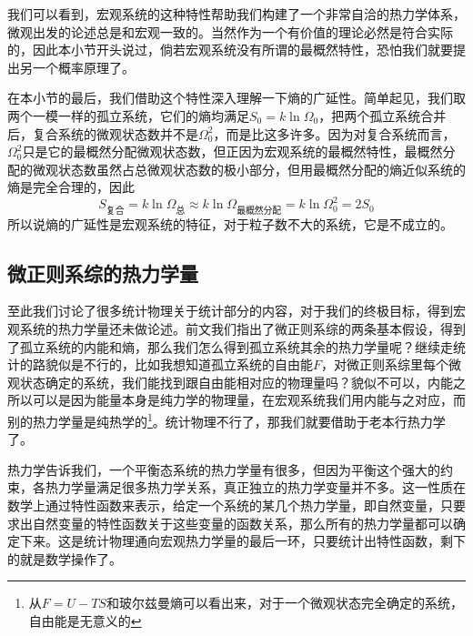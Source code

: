 \documentclass[../../main.tex]{subfiles}
\begin{document}
我们可以看到，宏观系统的这种特性帮助我们构建了一个非常自洽的热力学体系，微观出发的论述总是和宏观一致的。当然作为一个有价值的理论必然是符合实际的，因此本小节开头说过，倘若宏观系统没有所谓的最概然特性，恐怕我们就要提出另一个概率原理了。

在本小节的最后，我们借助这个特性深入理解一下熵的广延性。简单起见，我们取两个一模一样的孤立系统，它们的熵均满足\(S_0=k\ln\Omega_0\)，把两个孤立系统合并后，复合系统的微观状态数并不是\(\Omega_0^2\)，而是比这多许多。因为对复合系统而言，\(\Omega_0^2\)只是它的最概然分配微观状态数，但正因为宏观系统的最概然特性，最概然分配的微观状态数虽然占总微观状态数的极小部分，但用最概然分配的熵近似系统的熵是完全合理的，因此
\begin{equation}
    S_{\text{复合}}=k\ln\Omega_{\text{总}}\approx k\ln\Omega_{\text{最概然分配}}=k\ln\Omega_0^2=2S_0
\end{equation}
所以说熵的广延性是宏观系统的特征，对于粒子数不大的系统，它是不成立的。

\subsection{微正则系综的热力学量}

至此我们讨论了很多统计物理关于统计部分的内容，对于我们的终极目标，得到宏观系统的热力学量还未做论述。前文我们指出了微正则系综的两条基本假设，得到了孤立系统的内能和熵，那么我们怎么得到孤立系统其余的热力学量呢？继续走统计的路貌似是不行的，比如我想知道孤立系统的自由能\(F\)，对微正则系综里每个微观状态确定的系统，我们能找到跟自由能相对应的物理量吗？貌似不可以，内能之所以可以是因为能量本身是纯力学的物理量，在宏观系统我们用内能与之对应，而别的热力学量是纯热学的\footnote{从\(F=U-TS\)和玻尔兹曼熵可以看出来，对于一个微观状态完全确定的系统，自由能是无意义的}。统计物理不行了，那我们就要借助于老本行热力学了。

热力学告诉我们，一个平衡态系统的热力学量有很多，但因为平衡这个强大的约束，各热力学量满足很多热力学关系，真正独立的热力学变量并不多。这一性质在数学上通过特性函数来表示，给定一个系统的某几个热力学量，即自然变量，只要求出自然变量的特性函数关于这些变量的函数关系，那么所有的热力学量都可以确定下来。这是统计物理通向宏观热力学量的最后一环，只要统计出特性函数，剩下的就是数学操作了。
\end{document}
